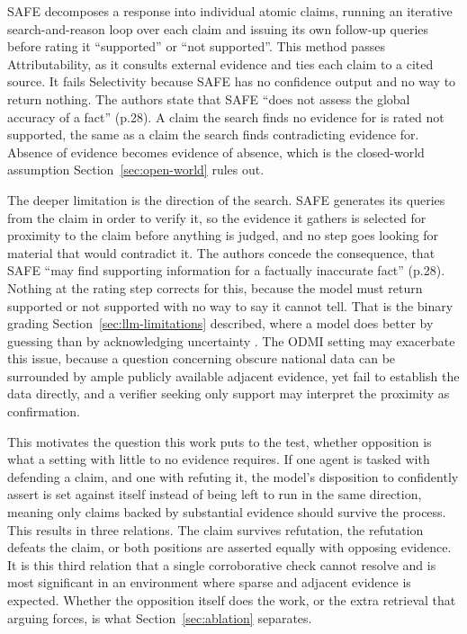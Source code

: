 SAFE \citep{wei2024} decomposes a response into individual atomic claims, running an iterative search-and-reason loop over each claim and issuing its own follow-up queries before rating it ``supported'' or ``not supported''. This method passes Attributability, as it consults external evidence and ties each claim to a cited source. It fails Selectivity because SAFE has no confidence output and no way to return nothing. The authors state that SAFE ``does not assess the global accuracy of a fact'' (p.28). A claim the search finds no evidence for is rated not supported, the same as a claim the search finds contradicting evidence for. Absence of evidence becomes evidence of absence, which is the closed-world assumption Section~\ref{sec:open-world} rules out.

The deeper limitation is the direction of the search. SAFE generates its queries from the claim in order to verify it, so the evidence it gathers is selected for proximity to the claim before anything is judged, and no step goes looking for material that would contradict it. The authors concede the consequence, that SAFE ``may find supporting information for a factually inaccurate fact'' (p.28). Nothing at the rating step corrects for this, because the model must return supported or not supported with no way to say it cannot tell. That is the binary grading Section~\ref{sec:llm-limitations} described, where a model does better by guessing than by acknowledging uncertainty \citep{kalai2025}. The ODMI setting may exacerbate this issue, because a question concerning obscure national data can be surrounded by ample publicly available adjacent evidence, yet fail to establish the data directly, and a verifier seeking only support may interpret the proximity as confirmation.

This motivates the question this work puts to the test, whether opposition is what a setting with little to no evidence requires. If one agent is tasked with defending a claim, and one with refuting it, the model's disposition to confidently assert is set against itself instead of being left to run in the same direction, meaning only claims backed by substantial evidence should survive the process. This results in three relations. The claim survives refutation, the refutation defeats the claim, or both positions are asserted equally with opposing evidence. It is this third relation that a single corroborative check cannot resolve and is most significant in an environment where sparse and adjacent evidence is expected. Whether the opposition itself does the work, or the extra retrieval that arguing forces, is what Section~\ref{sec:ablation} separates.

